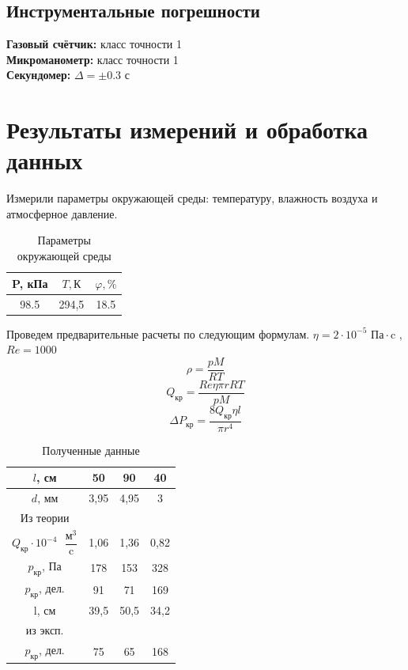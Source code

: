 \documentclass[a4paper, 12pt]{article}
\begin{document}
    \subsection*{Инструментальные погрешности}

     {\bf Газовый счётчик: } класс точности 1 \\
     {\bf Микроманометр: } класс точности 1 \\
     {\bf Секундомер: } $\Delta = \pm 0.3 $ с

\section{Результаты измерений и обработка данных}

Измерили параметры окружающей среды: температуру, влажность воздуха и атмосферное давление. 

\begin{table}[!ht]
    \centering
    \begin{tabular}{|c|c|c|}
    \hline
        P, кПа & $T, К$  & $\varphi, \%$  \\ \hline
        98.5 & 294,5 & 18.5  \\ \hline
    \end{tabular}
    \caption{Параметры окружающей среды}
\end{table}

Проведем предварительные расчеты по следующим формулам. $ \eta = 2 \cdot 10^{-5} \text{ Па} \cdot \text{c} $ , $Re = 1000$
\[ \rho  = \dfrac{pM}{RT} \] 
\[ Q_{\text{кр}} = \frac{Re  \eta  \pi  r  R  T }{p  M} \]
\[ \Delta P_{\text{кр}} = \frac{8Q_{\text{кр}} \eta l}{\pi r^4} \]

\begin{table}[!ht]
    \centering
    \begin{tabular}{|c|c|c|c|}
    \hline
        $l$, см & 50 & 90 & 40 \\ \hline
        $d$, мм & 3,95 & 4,95 & 3 \\ \hline
        Из теории & ~ & ~ & ~ \\ \hline
        $Q_{кр} \cdot 10^{-4} \text{ }\dfrac{\text{м} ^ 3}{\text{c}}$ & 1,06 & 1,36 & 0,82 \\ \hline
        $p_{кр}$, Па& 178 & 153 & 328 \\ \hline
        $p_{кр}$, дел. & 91 & 71 & 169 \\ \hline
        l, см & 39,5 & 50,5 & 34,2 \\ \hline
        из эксп. & ~ & ~ & ~ \\ \hline
        $p_{кр}$, дел. & 75 & 65 & 168 \\ \hline
    \end{tabular}
    \caption{Полученные данные}
\end{table}
\end{document}
